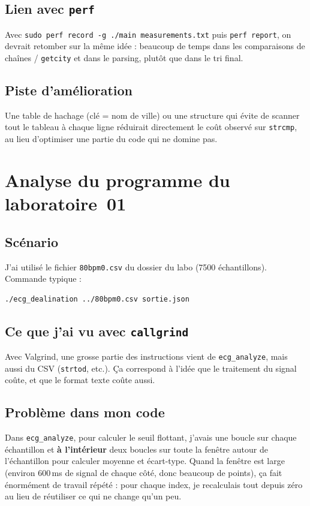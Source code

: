 \documentclass[a4paper,12pt]{article}
\begin{document}
\subsection{Lien avec \texttt{perf}}
Avec \texttt{sudo perf record -g ./main measurements.txt} puis \texttt{perf report}, on devrait retomber sur la même idée : beaucoup de temps dans les comparaisons de chaînes / \texttt{getcity} et dans le parsing, plutôt que dans le tri final.

\subsection{Piste d'amélioration}
Une table de hachage (clé = nom de ville) ou une structure qui évite de scanner tout le tableau à chaque ligne réduirait directement le coût observé sur \texttt{strcmp}, au lieu d'optimiser une partie du code qui ne domine pas.

\newpage

\section{Analyse du programme du laboratoire~01}

\subsection{Scénario}
J'ai utilisé le fichier \texttt{80bpm0.csv} du dossier du labo (7500 échantillons). Commande typique :
\begin{verbatim}
./ecg_dealination ../80bpm0.csv sortie.json
\end{verbatim}

\subsection{Ce que j'ai vu avec \texttt{callgrind}}
Avec Valgrind, une grosse partie des instructions vient de \texttt{ecg\_analyze}, mais aussi du CSV (\texttt{strtod}, etc.). Ça correspond à l'idée que le traitement du signal coûte, et que le format texte coûte aussi.

\subsection{Problème dans mon code}
Dans \texttt{ecg\_analyze}, pour calculer le seuil flottant, j'avais une boucle sur chaque échantillon et \textbf{à l'intérieur} deux boucles sur toute la fenêtre autour de l'échantillon pour calculer moyenne et écart-type. Quand la fenêtre est large (environ 600\,ms de signal de chaque côté, donc beaucoup de points), ça fait énormément de travail répété : pour chaque index, je recalculais tout depuis zéro au lieu de réutiliser ce qui ne change qu'un peu.
\end{document}
